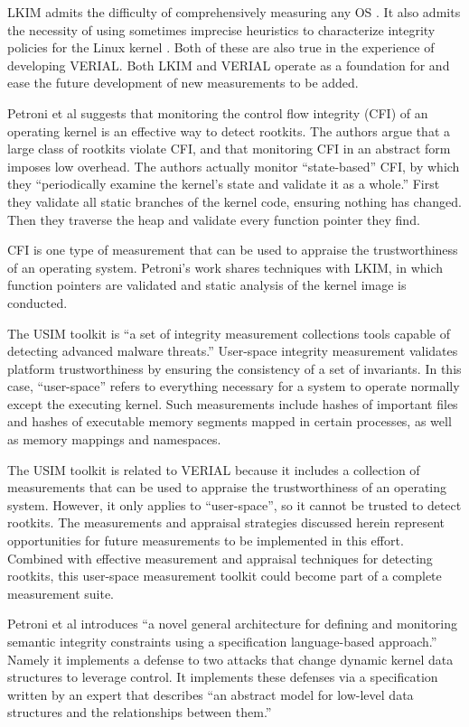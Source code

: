 \documentclass[a4paper,twoside]{article}
\begin{document}
LKIM admits the difficulty of comprehensively measuring any OS \cite{LKIMPaid}. It also admits the necessity of using sometimes imprecise heuristics to characterize integrity policies for the Linux kernel \cite{LKIMPaid}. Both of these are also true in the experience of developing VERIAL. Both LKIM and VERIAL operate as a foundation for and ease the future development of new measurements to be added.

Petroni et al \cite{AutoDetect} suggests that monitoring the control flow integrity (CFI) of an operating kernel is an effective way to detect rootkits. The authors argue that a large class of rootkits violate CFI, and that monitoring CFI in an abstract form imposes low overhead. The authors actually monitor ``state-based'' CFI, by which they ``periodically examine the kernel's state and validate it as a whole.'' First they validate all static branches of the kernel code, ensuring nothing has changed. Then they traverse the heap and validate every function pointer they find.

CFI is one type of measurement that can be used to appraise the trustworthiness of an operating system. Petroni's work shares techniques with LKIM, in which function pointers are validated and static analysis of the kernel image is conducted.

The USIM toolkit \cite{USIM} is ``a set of integrity measurement collections tools capable of detecting advanced malware threats.'' User-space integrity measurement validates platform trustworthiness by ensuring the consistency of a set of invariants. In this case, ``user-space'' refers to everything necessary for a system to operate normally except the executing kernel. Such measurements include hashes of important files and hashes of executable memory segments mapped in certain processes, as well as memory mappings and namespaces.

The USIM toolkit is related to VERIAL because it includes a collection of measurements that can be used to appraise the trustworthiness of an operating system. However, it only applies to ``user-space'', so it cannot be trusted to detect rootkits. The measurements and appraisal strategies discussed herein represent opportunities for future measurements to be implemented in this effort. Combined with effective measurement and appraisal techniques for detecting rootkits, this user-space measurement toolkit could become part of a complete measurement suite.

Petroni et al \cite{SemMeas} introduces ``a novel general architecture for defining and monitoring semantic integrity constraints using a specification language-based approach.'' Namely it implements a defense to two attacks that change dynamic kernel data structures to leverage control. It implements these defenses via a specification written by an expert that describes ``an abstract model for low-level data structures and the relationships between them.''
\end{document}
